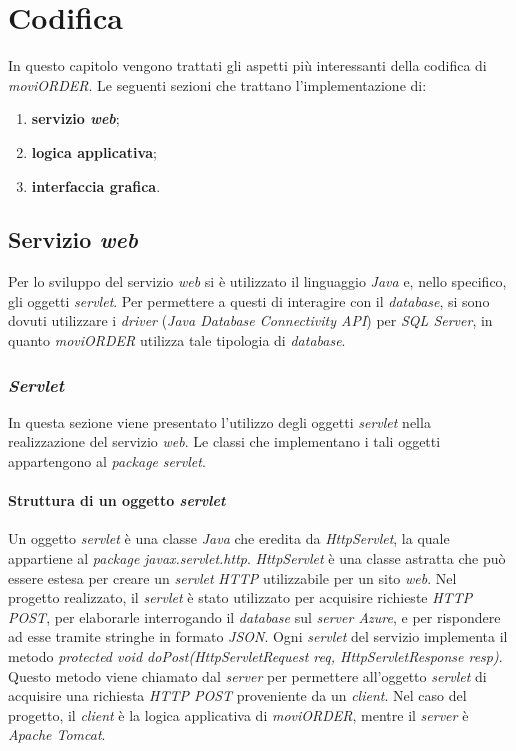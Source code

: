 \chapter{Codifica} \label{codifica}

In questo capitolo vengono trattati gli aspetti più interessanti della codifica di \textit{moviORDER}. Le seguenti sezioni che trattano l'implementazione di:
\begin{enumerate}
	\item \textbf{servizio \textit{web}};
	\item \textbf{logica applicativa};
	\item \textbf{interfaccia grafica}.
\end{enumerate}

\section{Servizio \textit{web}} \label{codificaservizio}

Per lo sviluppo del servizio \textit{web} si è utilizzato il linguaggio \textit{Java} e, nello specifico, gli oggetti \textit{servlet}. Per permettere a questi di interagire con il \textit{database}, si sono dovuti utilizzare i \textit{driver}  (\textit{Java Database Connectivity API}) per \textit{SQL Server}, in quanto \textit{moviORDER} utilizza tale tipologia di \textit{database}. 

\subsection{\textit{Servlet}}

In questa sezione viene presentato l'utilizzo degli oggetti \textit{servlet} nella realizzazione del servizio \textit{web}. Le classi che implementano i tali oggetti appartengono al \textit{package} \textit{servlet}.

\subsubsection{Struttura di un oggetto \textit{servlet}}

Un oggetto \textit{servlet} è una classe \textit{Java} che eredita da \textit{HttpServlet}, la quale appartiene al \textit{package} \textit{javax.servlet.http}. \textit{HttpServlet} è una classe astratta che può essere estesa per creare un \textit{servlet} \textit{HTTP} utilizzabile per un sito \textit{web}. Nel progetto realizzato, il \textit{servlet} è stato utilizzato per acquisire richieste \textit{HTTP POST}, per elaborarle interrogando il \textit{database} sul \textit{server Azure}, e per rispondere ad esse tramite stringhe in formato \textit{JSON}. Ogni \textit{servlet} del servizio implementa il metodo \textit{protected void doPost(HttpServletRequest req, HttpServletResponse resp)}. Questo metodo viene chiamato dal \textit{server} per permettere all'oggetto \textit{servlet} di acquisire una richiesta \textit{HTTP POST} proveniente da un \textit{client}. Nel caso del progetto, il \textit{client} è la logica applicativa di \textit{moviORDER}, mentre il \textit{server} è \textit{Apache Tomcat}.


